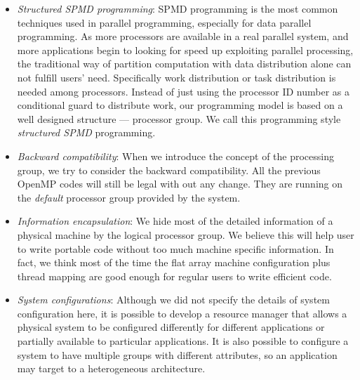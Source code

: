 \begin{itemize}

\item \emph{Structured SPMD programming}: SPMD programming is the most common
  techniques used in parallel programming, especially for data parallel
  programming. As more processors are available in a real parallel system, and
  more applications begin to looking for speed up exploiting parallel
  processing, the traditional way of partition computation with data
  distribution alone can not fulfill users' need. Specifically work
  distribution or task distribution is needed among processors. 
  Instead of just using the processor ID number as a conditional guard to
  distribute work, our programming model is based on a well designed structure
  --- processor group. We call this programming style \emph{structured SPMD}
  programming.

\item \emph{Backward compatibility}: When we introduce the concept of the
  processing group, we try to consider the backward compatibility. All the
  previous OpenMP codes will still be legal with out any change. They are
  running on the \emph{default} processor group provided by the system. 

\item \emph{Information encapsulation}: We hide most of the detailed
  information of a physical machine by the logical processor group. We believe
  this will help user to write portable code without too much machine specific
  information. In fact, we think most of the time the flat array machine
  configuration plus thread mapping are good enough for regular users to write
  efficient code.

\item \emph{System configurations}: Although we did not specify the details of
  system configuration here, it is possible to develop a resource manager that
  allows a physical system to be configured differently for different
  applications or partially available to particular applications. It is also
  possible to configure a system to have multiple groups with different
  attributes, so an application may target to a heterogeneous architecture.


\end{itemize}
